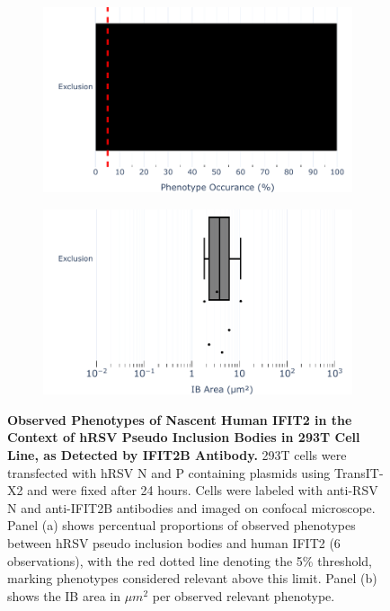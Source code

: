 \begin{figure}
    \begin{subfigure}{0.495\textwidth}
        \caption{}
        \includegraphics[width=1\linewidth]{09. Chapter 4/Figs/02. pIB/03. IFIT2B/01. bar_i2b_293t.pdf} 
    \end{subfigure}
    \begin{subfigure}{0.495\textwidth}
        \caption{}
        \includegraphics[width=1\linewidth]{09. Chapter 4/Figs/02. pIB/03. IFIT2B/02. box_i2b_293t.pdf}
    \end{subfigure}
    \caption[Observed Phenotypes of Nascent Human IFIT2 in the Context of hRSV Pseudo Inclusion Bodies in 293T Cell Line, as Detected by IFIT2B Antibody.]{\textbf{Observed Phenotypes of Nascent Human IFIT2 in the Context of hRSV Pseudo Inclusion Bodies in 293T Cell Line, as Detected by IFIT2B Antibody.} 293T cells were transfected with hRSV N and P containing plasmids using TransIT-X2 and were fixed after 24 hours. Cells were labeled with anti-RSV N and anti-IFIT2B antibodies and imaged on confocal microscope. Panel (a) shows percentual proportions of observed phenotypes between hRSV pseudo inclusion bodies and human IFIT2 (6 observations), with the red dotted line denoting the 5\% threshold, marking phenotypes considered relevant above this limit. Panel (b) shows the IB area in \(\mu m^2\) per observed relevant phenotype.}
    \label{fig:Observed Phenotypes of Nascent Human IFIT2 in the Context of hRSV Pseudo Inclusion Bodies in 293T Cell Line, as Detected by IFIT2B Antibody}
\end{figure}

